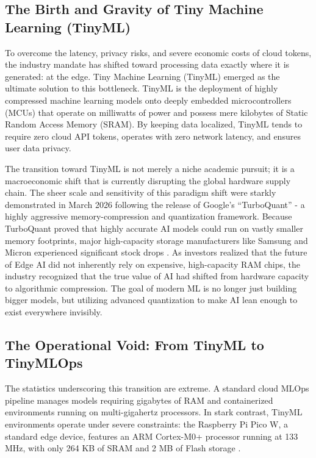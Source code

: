 \documentclass[11pt,a4paper,openany]{book}
\begin{document}
\subsection{The Birth and Gravity of Tiny Machine Learning (TinyML)}
To overcome the latency, privacy risks, and severe economic costs of cloud tokens, the industry mandate has shifted toward processing data exactly where it is generated: at the edge. Tiny Machine Learning (TinyML) emerged as the ultimate solution to this bottleneck. TinyML is the deployment of highly compressed machine learning models onto deeply embedded microcontrollers (MCUs) that operate on milliwatts of power and possess mere kilobytes of Static Random Access Memory (SRAM). By keeping data localized, TinyML tends to require zero cloud API tokens, operates with zero network latency, and ensures user data privacy.

The transition toward TinyML is not merely a niche academic pursuit; it is a macroeconomic shift that is currently disrupting the global hardware supply chain. The sheer scale and sensitivity of this paradigm shift were starkly demonstrated in March 2026 following the release of Google's ``TurboQuant'' - a highly aggressive memory-compression and quantization framework. Because TurboQuant proved that highly accurate AI models could run on vastly smaller memory footprints, major high-capacity storage manufacturers like Samsung and Micron experienced significant stock drops \cite{5}. As investors realized that the future of Edge AI did not inherently rely on expensive, high-capacity RAM chips, the industry recognized that the true value of AI had shifted from hardware capacity to algorithmic compression. The goal of modern ML is no longer just building bigger models, but utilizing advanced quantization to make AI lean enough to exist everywhere invisibly.

\subsection{The Operational Void: From TinyML to TinyMLOps}
The statistics underscoring this transition are extreme. A standard cloud MLOps pipeline manages models requiring gigabytes of RAM and containerized environments running on multi-gigahertz processors. In stark contrast, TinyML environments operate under severe constraints: the Raspberry Pi Pico W, a standard edge device, features an ARM Cortex-M0+ processor running at 133 MHz, with only 264 KB of SRAM and 2 MB of Flash storage \cite{7}.
\end{document}

